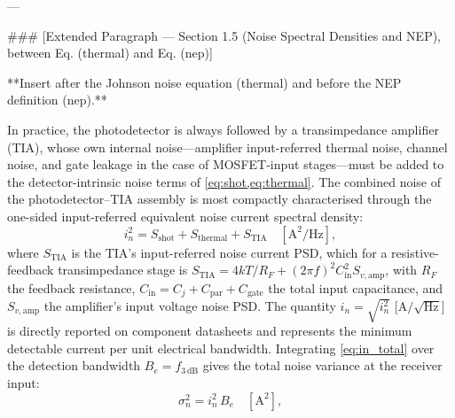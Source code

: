 ---

### [Extended Paragraph — Section 1.5 (Noise Spectral Densities and NEP), between Eq. (thermal) and Eq. (nep)]

**Insert after the Johnson noise equation (thermal) and before the NEP definition (nep).**

In practice, the photodetector is always followed by a transimpedance amplifier (TIA), whose own internal noise—amplifier input-referred thermal noise, channel noise, and gate leakage in the case of MOSFET-input stages—must be added to the detector-intrinsic noise terms of \cref{eq:shot,eq:thermal}. The combined noise of the photodetector–TIA assembly is most compactly characterised through the one-sided input-referred equivalent noise current spectral density:
\begin{equation}
    i_n^2 = S_\mathrm{shot} + S_\mathrm{thermal} + S_\mathrm{TIA}
    \quad [\si{\ampere\squared\per\hertz}],
    \label{eq:in_total}
\end{equation}
where $S_\mathrm{TIA}$ is the TIA's input-referred noise current PSD, which for a resistive-feedback transimpedance stage is $S_\mathrm{TIA} = 4kT/R_F + (2\pi f)^2 C_\mathrm{in}^2 S_{v,\mathrm{amp}}$, with $R_F$ the feedback resistance, $C_\mathrm{in} = C_j + C_\mathrm{par} + C_\mathrm{gate}$ the total input capacitance, and $S_{v,\mathrm{amp}}$ the amplifier's input voltage noise PSD. The quantity $i_n = \sqrt{i_n^2}$ [A$/\sqrt{\mathrm{Hz}}$] is directly reported on component datasheets and represents the minimum detectable current per unit electrical bandwidth. Integrating \cref{eq:in_total} over the detection bandwidth $B_e = f_{3\,\mathrm{dB}}$ gives the total noise variance at the receiver input:
\begin{equation}
    \sigma_n^2 = i_n^2\,B_e
    \quad [\si{\ampere\squared}],
    \label{eq:sigma_n}
\end{equation}
